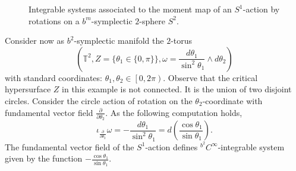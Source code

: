 \begin{example}
\begin{figure}[h!]
            \caption{Integrable systems associated to the moment map of an $S^1$-action by rotations  on a $b^m$-symplectic $2$-sphere $S^2$.}
            \label{fig:S2}
        \end{figure}
    \end{example}

\begin{example}
    Consider now as $b^2$-symplectic manifold the $2$-torus
\[
(\mathbb{T}^2, Z = \{\theta_1 \in \{0, \pi\}\}, \omega=  \frac{d\theta_1}{\sin^2\theta_1}\wedge d\theta_2)
\]
with standard coordinates: $\theta_1, \theta_2 \in \left[0, 2\pi \right)$.  Observe that the critical  hypersurface $Z$ in this example is not connected. It is the union of two disjoint circles. Consider  the circle action of rotation on the $\theta_2$-coordinate with fundamental vector field $\frac{\partial}{\partial\theta_2}$. As the following computation holds,
$$\iota_{\frac{\partial}{\partial\theta_2}}\omega = - \frac{d \theta_1}{\sin^2 \theta_1} = d\left(\frac{\cos\theta_1}{\sin\theta_1}\right).$$
The fundamental vector field of the $S^1$-action defines $^{b^2}C^{\infty}$-integrable system given by the function $-\frac{\cos\theta_1}{\sin\theta_1}$.


\end{example}


